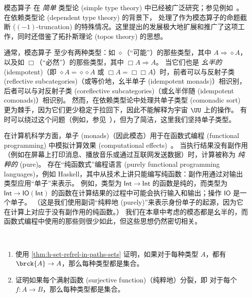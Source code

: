 模态算子 在 \emph{简单} 类型论 (simple type theory) 中已经被广泛研究；参见例如~\cite{modalTT}。在依赖类型论 (dependent type theory) 的背景下，\cite{ab:bracket-types} 处理了作为模态算子的命题截断 ($(-1)$-truncation) 的特殊情况。这里提出的发展极大地扩展和推广了这项工作，同时还借鉴了拓扑斯理论 (topos theory) 的思想。

通常，模态算子 至少有两种类型：如 $\diamond$（“可能”）的那些类型，其中 $A\Rightarrow \diamond A$，以及如 $\Box$（“必然”）的那些类型，其中 $\Box A \Rightarrow A$。
当它们也是 \emph{幺半的} (idempotent)（即 $\diamond A = \diamond{\diamond A}$ 或 $\Box A = \Box{\Box A}$）时，前者可以与反射子类 (reflective subcategories)（或等价地，幺半单子 (idempotent monads)）相识别，后者可以与对反射子类 (coreflective subcategories)（或幺半伴随 (idempotent comonads)）相识别。
然而，在依赖类型论中处理共单子类型 (comonadic sort) 更为棘手，因为它们更少稳定于拉回下，因此不能解释为宇宙 $\UU$ 上的操作。
有时可以绕过这个问题（例如，参见~\cite{QGFTinCHoTT12}），但为了简洁，这里我们坚持单子类型。

在计算机科学方面，单子 (monads)（因此模态）用于在函数式编程 (functional programming) 中模拟计算效果 (computational effects)~\cite{Moggi89}。%
%
当执行结果没有副作用（例如在屏幕上打印消息、播放音乐或通过互联网发送数据）时，计算被称为 \emph{纯粹的} (pure)。
存在“纯函数式”编程语言 (purely functional programming languages)，例如 Haskell，其中从技术上讲只能编写纯函数：副作用通过对输出类型应用“单子”来表示。
例如，类型为 $\mathsf{Int}\to\mathsf{Int}$ 的函数是纯的，而类型为 $\mathsf{Int}\to \mathsf{IO}(\mathsf{Int})$ 的函数在计算结果的过程中可能会执行输入和输出；操作 $\mathsf{IO}$ 是一个单子。
%
（这是我们使用副词“纯粹地 (purely)”来表示身份单子的起源，因为它在计算上对应于没有副作用的纯函数。）
我们在本章中考虑的模态都是幺半的，而函数式编程中使用的那些则很少如此，但这些思想仍然密切相关。

\sectionExercises

\begin{ex}\label{ex:all-types-sets}\
\begin{enumerate}
    \item 使用 \cref{thm:h-set-refrel-in-paths-sets} 证明，如果对于每种类型 $A$，都有 $\brck{A}\to A$，那么每种类型都是集合。
    \item 证明如果每个满射函数 (surjective function)（纯粹地）分裂，即
    对于每个 $f:A\to B$，那么每种类型都是集合。
\end{enumerate}
\end{ex}

